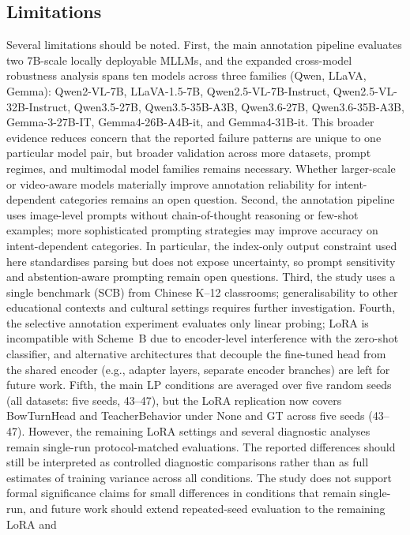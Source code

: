 \documentclass{ieeeaccess}
\begin{document}
\subsection{Limitations}
\label{sec:limitations}

Several limitations should be noted.
First, the main annotation pipeline evaluates two 7B-scale locally
deployable MLLMs, and the expanded cross-model robustness analysis spans
ten models across three families (Qwen, LLaVA, Gemma): Qwen2-VL-7B, LLaVA-1.5-7B,
Qwen2.5-VL-7B-Instruct, Qwen2.5-VL-32B-Instruct, Qwen3.5-27B,
Qwen3.5-35B-A3B, Qwen3.6-27B, Qwen3.6-35B-A3B, Gemma-3-27B-IT,
Gemma4-26B-A4B-it, and Gemma4-31B-it.
This broader evidence reduces concern that the reported failure
patterns are unique to one particular model pair, but broader
validation across more datasets, prompt regimes, and multimodal model
families remains necessary.
Whether larger-scale or video-aware models materially improve
annotation reliability for intent-dependent categories remains an open
question.
Second, the annotation pipeline uses image-level prompts without
chain-of-thought reasoning or few-shot examples; more sophisticated
prompting strategies may improve accuracy on intent-dependent
categories. In particular, the index-only output constraint used here
standardises parsing but does not expose uncertainty, so prompt
sensitivity and abstention-aware prompting remain open questions.
Third, the study uses a single benchmark
(SCB) from Chinese K--12 classrooms; generalisability to other
educational contexts and cultural settings requires further
investigation.
Fourth, the selective annotation experiment evaluates only linear
probing; LoRA is incompatible with Scheme~B due to encoder-level
interference with the zero-shot classifier, and alternative
architectures that decouple the fine-tuned head from the shared
encoder (e.g., adapter layers, separate encoder branches) are left
for future work.
Fifth, the main LP conditions are averaged over five random seeds
(all datasets: five seeds, 43--47), but the
LoRA replication now covers BowTurnHead and TeacherBehavior under None
and GT across five seeds (43--47). However, the remaining LoRA
settings and several diagnostic analyses remain single-run
protocol-matched evaluations. The reported differences
should still be interpreted as controlled diagnostic
comparisons rather than as full estimates of training variance across
all conditions.
The study does not support formal significance claims for
small differences in conditions that remain single-run, and future
work should extend repeated-seed evaluation to the remaining LoRA and
\end{document}
